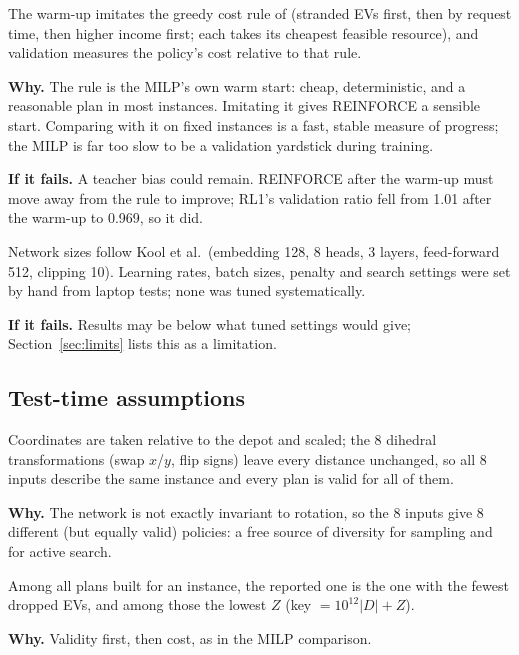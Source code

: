 \begin{assumption}\label{as:teacher}
The warm-up imitates the greedy cost rule of  (stranded EVs first, then by request time, then higher income first; each takes its cheapest feasible resource), and validation measures the policy's cost relative to that rule.

\textbf{Why.} The rule is the MILP's own warm start: cheap, deterministic, and a reasonable plan in most instances. Imitating it gives REINFORCE a sensible start. Comparing with it on fixed instances is a fast, stable measure of progress; the MILP is far too slow to be a validation yardstick during training.

\textbf{If it fails.} A teacher bias could remain. REINFORCE after the warm-up must move away from the rule to improve; RL1's validation ratio fell from 1.01 after the warm-up to 0.969, so it did.
\end{assumption}

\begin{assumption}[Hyperparameters]\label{as:hyper}
Network sizes follow Kool et al.\ (embedding 128, 8 heads, 3 layers, feed-forward 512, clipping 10). Learning rates, batch sizes, penalty and search settings were set by hand from laptop tests; none was tuned systematically.

\textbf{If it fails.} Results may be below what tuned settings would give; Section~\ref{sec:limits} lists this as a limitation.
\end{assumption}

\subsection{Test-time assumptions}

\begin{assumption}\label{as:aug}
Coordinates are taken relative to the depot and scaled; the 8 dihedral transformations (swap $x$/$y$, flip signs) leave every distance unchanged, so all 8 inputs describe the same instance and every plan is valid for all of them.

\textbf{Why.} The network is not exactly invariant to rotation, so the 8 inputs give 8 different (but equally valid) policies: a free source of diversity for sampling and for active search.
\end{assumption}

\begin{assumption}\label{as:select}
Among all plans built for an instance, the reported one is the one with the fewest dropped EVs, and among those the lowest $Z$ (key $=10^{12}|D|+Z$).

\textbf{Why.} Validity first, then cost, as in the MILP comparison.
\end{assumption}

